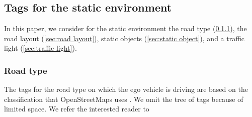 %
%



\subsection{Tags for the static environment}
\label{sec:tags selection static}

In this paper, we consider for the static environment the road type (\cref{sec:road type}), the road layout (\cref{sec:road layout}), static objects (\cref{sec:static object}), and a traffic light (\cref{sec:traffic light}).



\subsubsection{Road type}
\label{sec:road type}

The tags for the road type on which the ego vehicle is driving are based on the classification that OpenStreetMaps uses \autocite{HighwayKeyOSM}. We omit the tree of tags because of limited space. We refer the interested reader to \autocite{HighwayKeyOSM}

%



